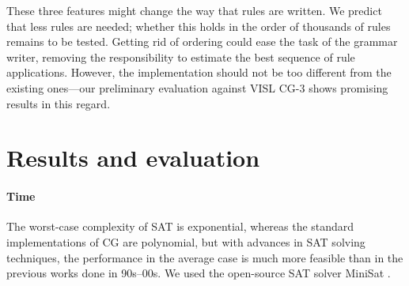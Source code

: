 \documentclass[11pt]{article}
\newcommand{\todo}[1]{{\color{cyan}\textbf{[TODO: }#1\textbf{]}}}
\begin{document}



\noindent These three features might change the way that rules are written. 
We predict that less rules are needed; whether this holds in
the order of thousands of rules remains to be tested.
Getting rid of ordering could ease the task of the grammar writer,
removing the responsibility to estimate the best sequence of rule applications.
However, the implementation should not be too different from the
existing ones---our preliminary evaluation against VISL CG-3 shows
promising results in this regard.


\section{Results and evaluation}

\paragraph{Time}

The worst-case complexity of SAT is exponential, whereas the standard
implementations of CG are polynomial, but with advances in SAT solving
techniques, the performance in the average case is much more feasible than in the previous works done in 90s--00s.
We used the open-source SAT solver MiniSat \cite{een04sat}.
\end{document}
